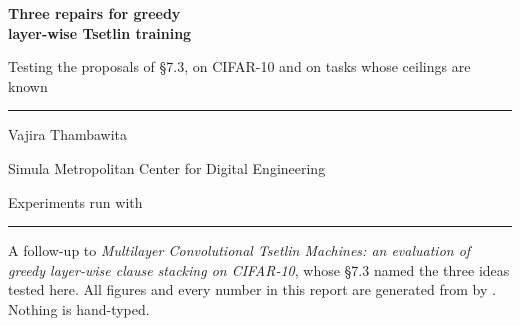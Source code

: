 \documentclass[11pt,a4paper]{article}
\begin{document}
\begin{titlepage}
\vspace*{18mm}
{\sffamily\bfseries\color{ttdeep}\Huge Three repairs for greedy\\[2mm] layer-wise Tsetlin training\par}
\vspace{6mm}
{\sffamily\LARGE\color{ttorange} Testing the proposals of \S7.3, on CIFAR-10 and on tasks
whose ceilings are known\par}
\vspace{10mm}
{\color{ttrule}\rule{\textwidth}{1.1pt}}
\vspace{6mm}

{\sffamily\large Vajira Thambawita\par}
{\sffamily\color{ttgray} Simula Metropolitan Center for Digital Engineering\par}
\vspace{3mm}
{\sffamily\color{ttgray} Experiments run with \ttlibname\ \ttversionreport\par}
\vspace{14mm}

\begin{ttcallout}[Summary]

\end{ttcallout}

\vfill
{\color{ttrule}\rule{\textwidth}{0.6pt}}
{\sffamily\footnotesize\color{ttgray} A follow-up to \emph{Multilayer Convolutional Tsetlin
Machines: an evaluation of greedy layer-wise clause stacking on CIFAR-10}, whose \S7.3 named
the three ideas tested here. All figures and every number in this report are generated from
 by . Nothing is
hand-typed.\par}
\end{titlepage}

{\sffamily\footnotesize
 \setlength{\parskip}{0pt}
 \renewcommand{\contentsname}{\textcolor{ttdeep}{Contents}}
 \tableofcontents}
\clearpage
{}










\end{document}
